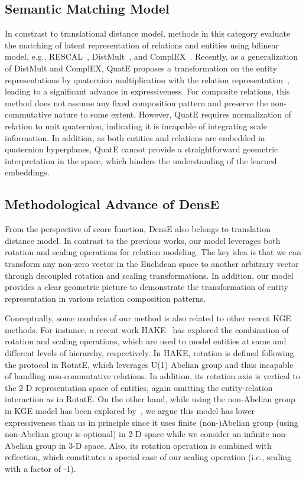 \documentclass[11pt]{article}
\begin{document}
\subsection{Semantic Matching Model}



In constrast to translational distance model, methods in this category evaluate the matching of latent representation of relations and entities using bilinear model, e.g., RESCAL~\cite{nickel2011three}, DistMult~\cite{yang2014embedding}, and ComplEX~\cite{Trouillon2016ComplexEF}. 
Recently, as a generalization of DistMult and ComplEX, QuatE proposes a transformation on the entity representations by quaternion multiplication with the relation representation~\cite{zhang2019quaternion}, leading to a significant advance in expressiveness. For composite relations, this method does not assume any fixed composition pattern and preserve the non-commutative nature to some extent. However, QuatE requires normalization of relation to unit quaternion, indicating it is incapable of integrating scale information. In addition, as both entities and relations are embedded in quaternion hyperplanes, QuatE cannot provide a straightforward geometric interpretation in the space, which hinders the understanding of the learned embeddings. 





\subsection{Methodological Advance of DensE}
From the perspective of score function, DensE also belongs to translation distance model. In contrast to the previous works, our model leverages both rotation and scaling operations for relation modeling. The key idea is that we can transform any non-zero vector in the Euclidean space to another arbitrary vector through decoupled rotation and scaling transformations. In addition, our model provides a clear geometric picture to demonstrate the transformation of entity representation in various relation composition patterns.

Conceptually, some modules of our method is also related to other recent KGE methods. For instance, a recent work HAKE~\cite{zhang2020learning} has explored the combination of rotation and scaling operations, which are used to model  entities at same and different levels of hierarchy, respectively. In HAKE, rotation is defined following the protocol in RotatE, which leverages U(1) Abelian group and thus incapable of handling non-commutative relations. In addition, its rotation axis is vertical to the 2-D representation space of entities, again omitting the entity-relation interaction as in RotatE. On the other hand, while using the non-Abelian group in KGE model has been explored by~\cite{xu2019relation}, we argue this model has lower expressiveness than us in principle since it uses finite (non-)Abelian group (using non-Abelian group is optional) in 2-D space while we consider an infinite non-Abelian group in 3-D space. Also, its rotation operation is combined with reflection, which constitutes a special case of our scaling operation (i.e., scaling with a factor of -1). 
\end{document}
